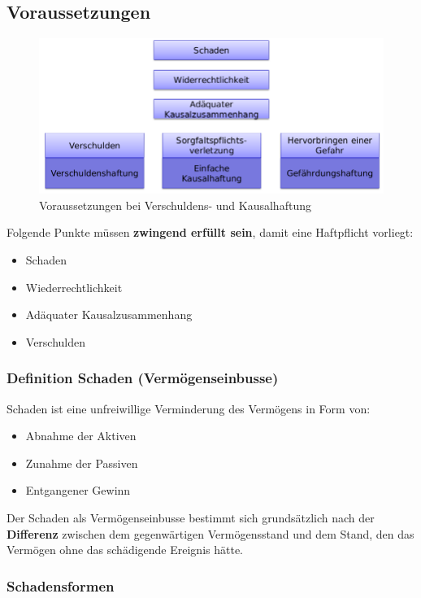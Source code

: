 \subsection{Voraussetzungen}

\begin{figure}[H]
	\centering
	\includegraphics[width=.8\textwidth]{figures/haftpflichtVerschulden.png}
	\caption{Voraussetzungen bei Verschuldens- und Kausalhaftung}
\end{figure}

Folgende Punkte müssen \textbf{zwingend erfüllt sein}, damit eine Haftpflicht
vorliegt:

\begin{itemize}
\tightlist
\item Schaden
\item Wiederrechtlichkeit
\item Adäquater Kausalzusammenhang
\item Verschulden
\end{itemize}


\subsubsection{Definition Schaden (Vermögenseinbusse)}

Schaden ist eine unfreiwillige Verminderung des Vermögens in Form von:
\begin{itemize}
	\tightlist
	\item Abnahme der Aktiven
	\item Zunahme der Passiven
	\item Entgangener Gewinn
\end{itemize}

Der Schaden als Vermögenseinbusse bestimmt sich grundsätzlich nach
der \textbf{Differenz} zwischen dem gegenwärtigen Vermögensstand und dem Stand,
den das Vermögen ohne das schädigende Ereignis hätte.


\subsubsection{Schadensformen}

